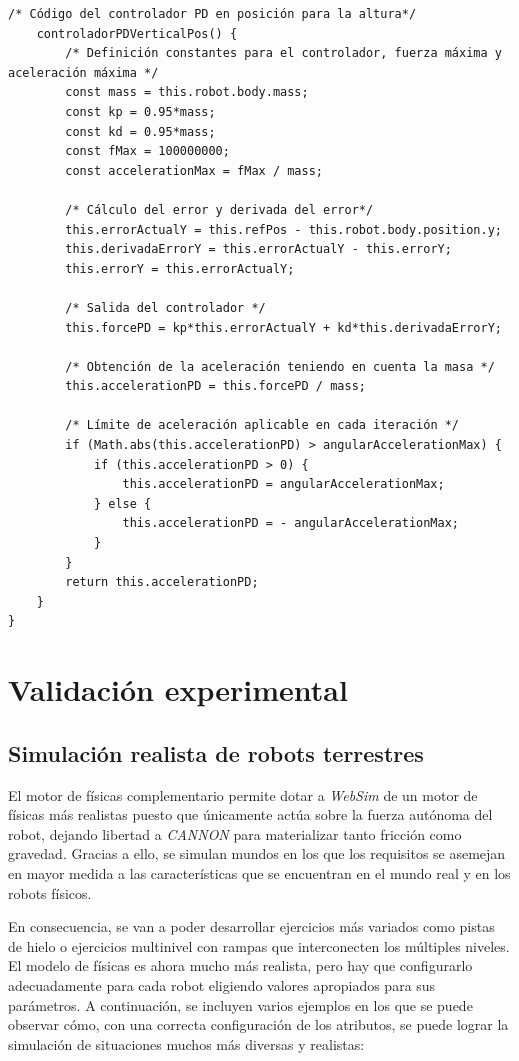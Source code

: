 \footnotesize {
\begin{verbatim}  
/* Código del controlador PD en posición para la altura*/
    controladorPDVerticalPos() {
        /* Definición constantes para el controlador, fuerza máxima y                   aceleración máxima */
        const mass = this.robot.body.mass;
        const kp = 0.95*mass;
        const kd = 0.95*mass;
        const fMax = 100000000;
        const accelerationMax = fMax / mass;

        /* Cálculo del error y derivada del error*/
        this.errorActualY = this.refPos - this.robot.body.position.y;
        this.derivadaErrorY = this.errorActualY - this.errorY;
        this.errorY = this.errorActualY;
        
        /* Salida del controlador */
        this.forcePD = kp*this.errorActualY + kd*this.derivadaErrorY;
        
        /* Obtención de la aceleración teniendo en cuenta la masa */
        this.accelerationPD = this.forcePD / mass;

        /* Límite de aceleración aplicable en cada iteración */
        if (Math.abs(this.accelerationPD) > angularAccelerationMax) {
            if (this.accelerationPD > 0) {
                this.accelerationPD = angularAccelerationMax;
            } else {
                this.accelerationPD = - angularAccelerationMax;
            }
        }
        return this.accelerationPD;
    }
}
\end{verbatim}
}

\normalsize
\section{Validación experimental}
\subsection{Simulación realista de robots terrestres}
El motor de físicas complementario permite dotar a \textit{WebSim} de un motor de físicas más realistas puesto que únicamente actúa sobre la fuerza autónoma del robot, dejando libertad a \textit{CANNON} para materializar tanto fricción como gravedad. Gracias a ello, se simulan mundos en los que los requisitos se asemejan en mayor medida a las características que se encuentran en el mundo real y en los robots físicos. \newline

En consecuencia, se van a poder desarrollar ejercicios más variados como pistas de hielo o ejercicios multinivel con rampas que interconecten los múltiples niveles. El modelo de físicas es ahora mucho más realista, pero hay que configurarlo adecuadamente para
cada robot eligiendo valores apropiados para sus parámetros. A continuación, se incluyen varios ejemplos en los que se puede observar cómo, con una correcta configuración de los atributos, se puede lograr la simulación de situaciones muchos más diversas y realistas:

